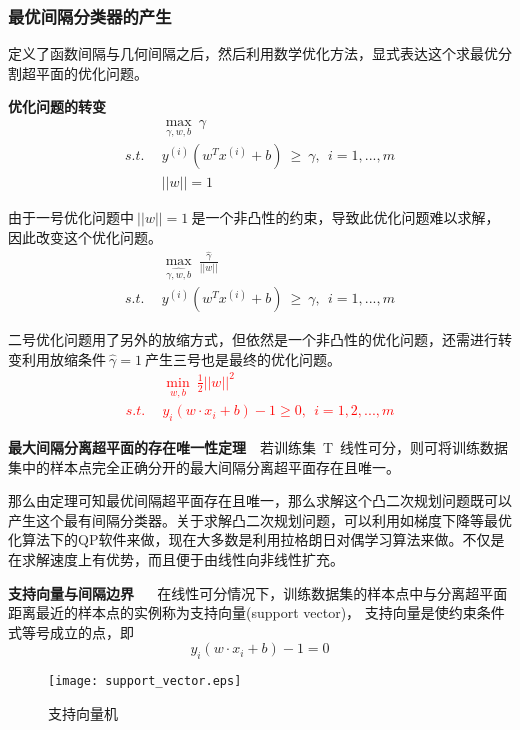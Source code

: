 \subsubsection{最优间隔分类器的产生}
定义了函数间隔与几何间隔之后，然后利用数学优化方法，显式表达这个求最优分割超平面的优化问题。

\textbf{优化问题的转变}
\begin{align}
            &\max \limits_{\gamma,w,b}~\gamma  \nonumber  \\
    s.t.~~  &y^{(i)}(w^Tx^{(i)}+b)~\geq~\gamma,~~i=1,...,m\nonumber\\
            &||w||=1   \nonumber
\end{align}

由于一号优化问题中$~||w||=1~$是一个非凸性的约束，导致此优化问题难以求解，因此改变这个优化问题。
\begin{align}
            &\max \limits_{\hat{\gamma,w,b}}~\frac{\hat{\gamma}}{||w||}  \nonumber  \\
    s.t.~~  &y^{(i)}(w^Tx^{(i)}+b)~\geq~\gamma,~~i=1,...,m \nonumber
\end{align}

二号优化问题用了另外的放缩方式，但依然是一个非凸性的优化问题，还需进行转变利用放缩条件$~\hat{\gamma}=1~$产生三号也是最终的优化问题。
\textcolor{red}{\begin{align}
            &\min \limits_{w,b} ~\frac{1}{2}||w||^2  \nonumber  \\
    s.t.~~  &y_i(w\cdot x_i+b)-1 \geq 0,~~i=1,2,...,m\nonumber
\end{align}}


\textbf{最大间隔分离超平面的存在唯一性定理}~~若训练集~T~线性可分，则可将训练数据集中的样本点完全正确分开的最大间隔分离超平面存在且唯一。

那么由定理可知最优间隔超平面存在且唯一，那么求解这个凸二次规划问题既可以产生这个最有间隔分类器。关于求解凸二次规划问题，可以利用如梯度下降等最优化算法下的QP软件来做，现在大多数是利用拉格朗日对偶学习算法来做。不仅是在求解速度上有优势，而且便于由线性向非线性扩充。

\textbf{支持向量与间隔边界} ~~ 在线性可分情况下，训练数据集的样本点中与分离超平面距离最近的样本点的实例称为支持向量(support vector)， 支持向量是使约束条件式等号成立的点，即
$$y_i(w\cdot x_i+b)-1=0$$

\begin{figure}[!htb]
  \centering
  \texttt{[image: support\_vector.eps]}
  \caption{支持向量机}
\end{figure}

